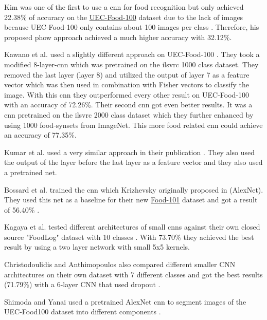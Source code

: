 Kim was one of the first to use a \gls{cnn} for food recognition but only achieved 22.38\% of accuracy on the \hyperref[subsec:relWork_Datasets_food100256]{UEC-Food-100} dataset due to the lack of images because UEC-Food-100 only contains about 100 images per class \cite{Kim2014}. Therefore, his proposed \gls{phow} approach achieved a much higher accuracy with 32.12\%.

Kawano et al. used a slightly different approach on UEC-Food-100 \cite{Kawano2014}. They took a modified 8-layer-\gls{cnn} which was pretrained on the \gls{ilsvrc} 1000 class dataset. They removed the last layer {(layer 8)} and utilized the output of layer 7 as a feature vector which was then used in combination with Fisher vectors to classify the image. With this \gls{cnn} they outperformed every other result on UEC-Food-100 with an accuracy of 72.26\%. Their second \gls{cnn} got even better results. It was a \gls{cnn} pretrained on the \gls{ilsvrc} 2000 class dataset which they further enhanced by using 1000 food-\glspl{synset} from ImageNet. This more food related \gls{cnn} could achieve an accuracy of 77.35\%.

Kumar et al. used a very similar approach in their publication \cite{Kumar2015}. They also used the output of the layer before the last layer as a feature vector and they also used a pretrained net.

Bossard et al. trained the \gls{cnn} which Krizhevsky originally proposed in \cite{Krizhevsky2012} {(AlexNet)}. They used this net as a baseline for their new \hyperref[subsec:relWork_Datasets_food101]{Food-101} dataset and got a result of 56.40\% \cite{Bossard2014}.

Kagaya et al. tested different architectures of small \glspl{cnn} against their own closed source "FoodLog" dataset with 10 classes \cite{Kagaya2015}. With 73.70\% they achieved the best result by using a two layer network with small 5x5 kernels.

Christodoulidis and Anthimopoulos also compared different smaller CNN architectures on their own dataset with 7 different classes and got the best results (71.79\%) with a 6-layer CNN that used dropout \cite{Christodoulidis2015}.

Shimoda and Yanai used a pretrained AlexNet \gls{cnn} to segment images of the UEC-Food100 dataset into different components \cite{Shimoda2015}.

